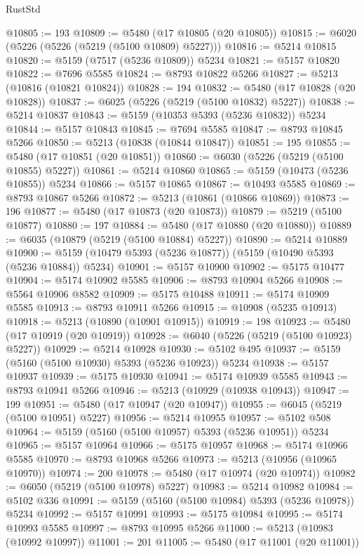 \begin{lexlean}{RustStd}
\begin{coremodule}
@10805 := 193
@10809 := @5480 (@17 @10805 (@20 @10805))
@10815 := @6020 (@5226 (@5226 (@5219 (@5100 @10809) @5227)))
@10816 := @5214 @10815
@10820 := @5159 (@7517 (@5236 @10809)) @5234
@10821 := @5157 @10820
@10822 := @7696 @5585
@10824 := @8793 @10822 @5266
@10827 := @5213 (@10816 (@10821 @10824))
@10828 := 194
@10832 := @5480 (@17 @10828 (@20 @10828))
@10837 := @6025 (@5226 (@5219 (@5100 @10832) @5227))
@10838 := @5214 @10837
@10843 := @5159 (@10353 @5393 (@5236 @10832)) @5234
@10844 := @5157 @10843
@10845 := @7694 @5585
@10847 := @8793 @10845 @5266
@10850 := @5213 (@10838 (@10844 @10847))
@10851 := 195
@10855 := @5480 (@17 @10851 (@20 @10851))
@10860 := @6030 (@5226 (@5219 (@5100 @10855) @5227))
@10861 := @5214 @10860
@10865 := @5159 (@10473 (@5236 @10855)) @5234
@10866 := @5157 @10865
@10867 := @10493 @5585
@10869 := @8793 @10867 @5266
@10872 := @5213 (@10861 (@10866 @10869))
@10873 := 196
@10877 := @5480 (@17 @10873 (@20 @10873))
@10879 := @5219 (@5100 @10877)
@10880 := 197
@10884 := @5480 (@17 @10880 (@20 @10880))
@10889 := @6035 (@10879 (@5219 (@5100 @10884) @5227))
@10890 := @5214 @10889
@10900 := @5159 (@10479 @5393 (@5236 @10877)) (@5159 (@10490 @5393 (@5236 @10884)) @5234)
@10901 := @5157 @10900
@10902 := @5175 @10477
@10904 := @5174 @10902 @5585
@10906 := @8793 @10904 @5266
@10908 := @5564 @10906 @8582
@10909 := @5175 @10488
@10911 := @5174 @10909 @5585
@10913 := @8793 @10911 @5266
@10915 := @10908 (@5235 @10913)
@10918 := @5213 (@10890 (@10901 @10915))
@10919 := 198
@10923 := @5480 (@17 @10919 (@20 @10919))
@10928 := @6040 (@5226 (@5219 (@5100 @10923) @5227))
@10929 := @5214 @10928
@10930 := @5102 @495
@10937 := @5159 (@5160 (@5100 @10930) @5393 (@5236 @10923)) @5234
@10938 := @5157 @10937
@10939 := @5175 @10930
@10941 := @5174 @10939 @5585
@10943 := @8793 @10941 @5266
@10946 := @5213 (@10929 (@10938 @10943))
@10947 := 199
@10951 := @5480 (@17 @10947 (@20 @10947))
@10955 := @6045 (@5219 (@5100 @10951) @5227)
@10956 := @5214 @10955
@10957 := @5102 @508
@10964 := @5159 (@5160 (@5100 @10957) @5393 (@5236 @10951)) @5234
@10965 := @5157 @10964
@10966 := @5175 @10957
@10968 := @5174 @10966 @5585
@10970 := @8793 @10968 @5266
@10973 := @5213 (@10956 (@10965 @10970))
@10974 := 200
@10978 := @5480 (@17 @10974 (@20 @10974))
@10982 := @6050 (@5219 (@5100 @10978) @5227)
@10983 := @5214 @10982
@10984 := @5102 @336
@10991 := @5159 (@5160 (@5100 @10984) @5393 (@5236 @10978)) @5234
@10992 := @5157 @10991
@10993 := @5175 @10984
@10995 := @5174 @10993 @5585
@10997 := @8793 @10995 @5266
@11000 := @5213 (@10983 (@10992 @10997))
@11001 := 201
@11005 := @5480 (@17 @11001 (@20 @11001))

\end{coremodule}
\end{lexlean}

